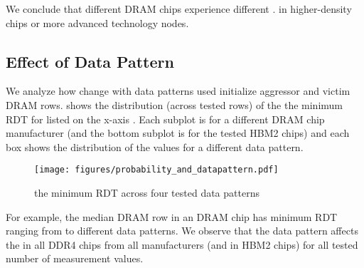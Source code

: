 We conclude that different DRAM chips experience different \phenomenon{}
.  in higher-density chips or  more advanced
technology nodes. 

\subsection{Effect of Data Pattern}

We analyze how  \phenomenon{}  change with data patterns used  initialize aggressor
and victim DRAM rows.  shows the distribution
(across tested rows) of the  the minimum
RDT for    listed on
the x-axis .
Each subplot is for a different DRAM chip manufacturer (and the bottom subplot
is for the tested HBM2 chips)\gra{,} and each box shows the distribution of the
 values for a different data pattern.

\begin{figure}[!ht]
    \centering
    \texttt{[image: figures/probability\_and\_datapattern.pdf]}
    \caption{ the minimum RDT
     across four tested data patterns}
    \label{fig:rdt_data_pattern}
\end{figure}


For example, the median DRAM row  in an  DRAM chip has 
 minimum RDT  ranging from 
 to 
  different data patterns. We observe
that the data pattern affects the  in all DDR4 chips from
all manufacturers (and in HBM2 chips) for all tested number of
measurement values.


